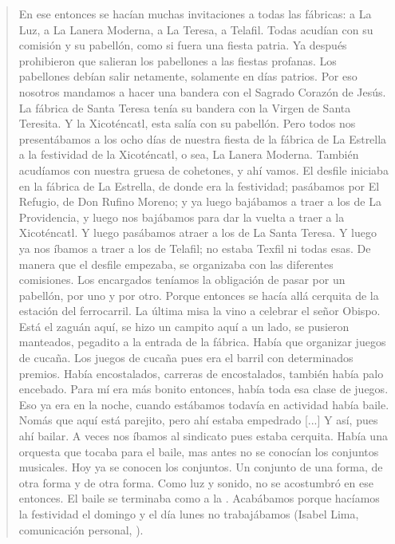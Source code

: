 \documentclass[14pt,letterpaper,twoside]{extbook} %
\begin{document}
\begin{quotation}
\noindent En ese entonces se hacían muchas invitaciones a todas las fábricas: a La Luz, a La Lanera Moderna, a La Teresa, a Telafil. Todas acudían con su comisión y su pabellón, como si fuera una fiesta patria. Ya después prohibieron que salieran los pabellones a las fiestas profanas. Los pabellones debían salir netamente, solamente en días patrios. Por eso nosotros mandamos a hacer una bandera con el Sagrado Corazón de Jesús. La fábrica de Santa Teresa tenía su bandera con la Virgen de Santa Teresita. Y la Xicoténcatl, esta salía con su pabellón. Pero todos nos presentábamos a los ocho días de nuestra fiesta de la fábrica de La Estrella a la festividad de la Xicoténcatl, o
sea, La Lanera Moderna. También acudíamos con nuestra gruesa de cohetones, y ahí vamos. El desfile iniciaba en la fábrica de La Estrella, de donde era la festividad; pasábamos por El Refugio, de Don Rufino Moreno; y ya luego bajábamos a traer a los de La Providencia, y luego nos bajábamos para dar la vuelta a traer a la Xicoténcatl. Y luego pasábamos atraer a los de La Santa Teresa. Y luego ya nos íbamos a traer a los de Telafil; no estaba Texfil ni todas esas. De manera que el desfile empezaba, se organizaba con las diferentes comisiones. Los encargados teníamos la obligación de pasar por un pabellón, por uno y por otro. Porque entonces se hacía allá cerquita de la estación del ferrocarril. La última misa la vino a celebrar el señor Obispo. Está el zaguán aquí, se hizo un campito aquí a un lado, se pusieron manteados, pegadito a la entrada de la fábrica. Había que organizar juegos de cucaña. Los juegos de cucaña pues era el barril con determinados premios. Había encostalados, carreras de encostalados, también había palo encebado. Para mí era más bonito entonces, había toda esa clase de juegos. Eso ya era en la noche, cuando estábamos todavía en actividad había baile. Nomás que aquí está parejito, pero ahí estaba empedrado [...] Y así, pues
ahí bailar. A veces nos íbamos al sindicato pues estaba cerquita. Había una orquesta que tocaba para el baile, mas antes no se conocían los conjuntos musicales. Hoy ya se conocen los conjuntos. Un conjunto de una forma, de otra forma y de otra forma. Como luz y sonido, no se acostumbró en ese entonces. El baile se terminaba como a la . Acabábamos porque hacíamos la festividad el domingo y el día lunes no trabajábamos (Isabel Lima, comunicación personal, ).
\end{quotation}
\end{document}
